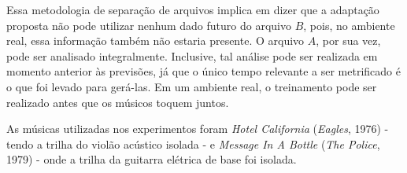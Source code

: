 Essa metodologia de separação de arquivos implica em dizer que a adaptação proposta não pode utilizar nenhum dado futuro do arquivo $B$, pois, no ambiente real, essa informação também não estaria presente. O arquivo $A$, por sua vez, pode ser analisado integralmente. Inclusive, tal análise pode ser realizada em momento anterior às previsões, já que o único tempo relevante a ser metrificado é o que foi levado para gerá-las. Em um ambiente real, o treinamento pode ser realizado antes que os músicos toquem juntos.

As músicas utilizadas nos experimentos foram \textit{Hotel California} (\textit{Eagles}, 1976) - tendo a trilha do violão acústico isolada - e \textit{Message In A Bottle} (\textit{The Police}, 1979) - onde a trilha da guitarra elétrica de base foi isolada.
